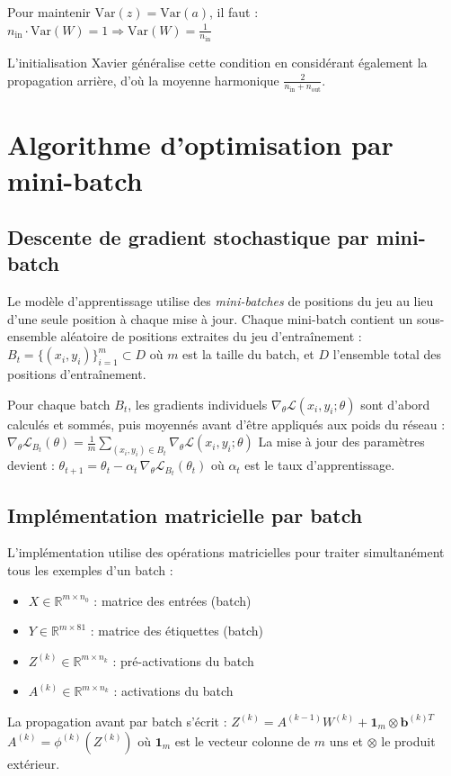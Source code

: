 \documentclass[12pt,a4paper]{report}
\numberwithin{equation}{section}
\begin{document}
Pour maintenir $\text{Var}(z) = \text{Var}(a)$, il faut :
$n_{\text{in}} \cdot \text{Var}(W) = 1 \Rightarrow \text{Var}(W) = \frac{1}{n_{\text{in}}}$

L'initialisation Xavier généralise cette condition en considérant également la propagation arrière, d'où la moyenne harmonique $\frac{2}{n_{\text{in}} + n_{\text{out}}}$.

\section{Algorithme d'optimisation par mini-batch}

\subsection{Descente de gradient stochastique par mini-batch}

Le modèle d'apprentissage utilise des \emph{mini-batches} de positions du jeu au lieu d'une seule position à chaque mise à jour.
Chaque mini-batch contient un sous-ensemble aléatoire de positions extraites du jeu d'entraînement :
$B_t = \{(x_i, y_i)\}_{i=1}^{m} \subset D$
où $m$ est la taille du batch, et $D$ l'ensemble total des positions d'entraînement.

\begin{definition}
Pour chaque batch $B_t$, les gradients individuels $\nabla_\theta \mathcal{L}(x_i, y_i; \theta)$ sont d'abord calculés et sommés, puis moyennés avant d'être appliqués aux poids du réseau :
$\nabla_\theta \mathcal{L}_{B_t}(\theta) = \frac{1}{m} \sum_{(x_i, y_i) \in B_t} \nabla_\theta \mathcal{L}(x_i, y_i; \theta)$
La mise à jour des paramètres devient :
$\theta_{t+1} = \theta_t - \alpha_t \, \nabla_\theta \mathcal{L}_{B_t}(\theta_t)$
où $\alpha_t$ est le taux d'apprentissage.
\end{definition}

\subsection{Implémentation matricielle par batch}

\begin{important}
L'implémentation utilise des opérations matricielles pour traiter simultanément tous les exemples d'un batch :
\begin{itemize}
  \item $X \in \mathbb{R}^{m \times n_0}$ : matrice des entrées (batch)
  \item $Y \in \mathbb{R}^{m \times 81}$ : matrice des étiquettes (batch)
  \item $Z^{(k)} \in \mathbb{R}^{m \times n_k}$ : pré-activations du batch
  \item $A^{(k)} \in \mathbb{R}^{m \times n_k}$ : activations du batch
\end{itemize}

La propagation avant par batch s'écrit :
$Z^{(k)} = A^{(k-1)} W^{(k)} + \mathbf{1}_m \otimes \mathbf{b}^{(k)T}$
$A^{(k)} = \phi^{(k)}(Z^{(k)})$
où $\mathbf{1}_m$ est le vecteur colonne de $m$ uns et $\otimes$ le produit extérieur.
\end{important}
\end{document}

